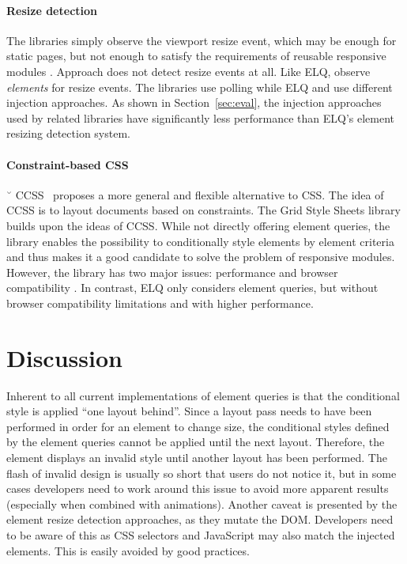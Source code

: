 \documentclass[sigplan,9pt]{acmart}
\newcommand{\elq}{ELQ}
\begin{document}
  \paragraph{Resize detection}
  The libraries \cite{eq_imp_eqcss,eq_imp_breakpointsjs,eq_imp_mediaclass,eq_imp_elementquery,eq_imp_responsive-elements,eq_imp_sickles,eq_imp_responsive-elements-2,eq_imp_breaks2000,eq_imp_eqjs} simply observe the viewport resize event, which may be enough for static pages, but not enough to satisfy the requirements of reusable responsive modules \cite{elq-thesis}.
  Approach \cite{eq_imp_classquery} does not detect resize events at all.
  Like \elq{}, \cite{eq_imp_localised-css,eq_imp_selector_queries,eq_imp_prollyfill-min-width,eq_imp_gss,eq_imp_element-queries,eq_imp_css-element-queries} observe \emph{elements} for resize events.
  The libraries \cite{eq_imp_localised-css,eq_imp_selector_queries} use polling while \elq{} and \cite{eq_imp_prollyfill-min-width,eq_imp_gss,eq_imp_element-queries,eq_imp_css-element-queries} use different injection approaches.
  As shown in Section~\ref{sec:eval}, the injection approaches used by related libraries have significantly less performance than \elq{}'s element resizing detection system.

  \paragraph{Constraint-based CSS}˘
  CCSS~\cite{badros1999constraint} proposes a more general and flexible alternative to CSS.
  The idea of CCSS is to layout documents based on constraints.
  The Grid Style Sheets library \cite{eq_imp_gss} builds upon the ideas of CCSS.
  While not directly offering element queries, the library enables the possibility to conditionally style elements by element criteria and thus makes it a good candidate to solve the problem of responsive modules.
  However, the library has two major issues: performance and browser compatibility \cite{gss_issue}.
  In contrast, \elq{} only considers element queries, but without browser compatibility limitations and with higher performance.

  \section{Discussion}\label{sec:discussion}
      Inherent to all current implementations of element queries is that the conditional style is applied ``one layout behind''.
      Since a layout pass needs to have been performed in order for an element to change size, the conditional styles defined by the element queries cannot be applied until the next layout.
      Therefore, the element displays an invalid style until another layout has been performed.
      The flash of invalid design is usually so short that users do not notice it, but in some cases developers need to work around this issue to avoid more apparent results (especially when combined with animations).
      Another caveat is presented by the element resize detection approaches, as they mutate the DOM.
      Developers need to be aware of this as CSS selectors and JavaScript may also match the injected elements.
      This is easily avoided by good practices.
\end{document}
